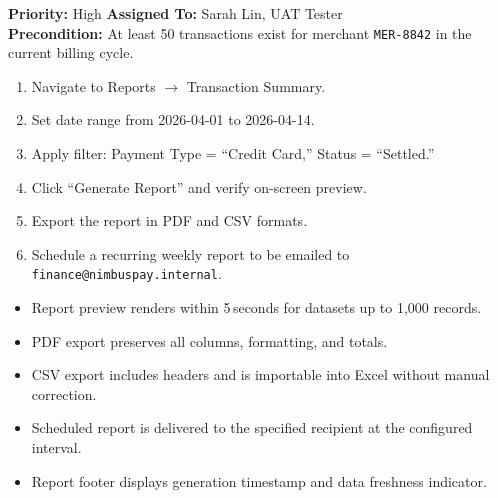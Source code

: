 \begin{tcolorbox}[
  enhanced,
  colback=white,
  colframe=accentBlue,
  boxrule=1pt,
  left=12pt,
  right=12pt,
  top=10pt,
  bottom=10pt,
  sharp corners,
  title={\textbf{TC-003: Transaction Report Generation \& Export}},
  fonttitle=\bfseries\color{white},
  colbacktitle=accentBlue
]
  \textbf{Priority:} High \hfill \textbf{Assigned To:} Sarah Lin, UAT Tester\\[4pt]
  \textbf{Precondition:} At least 50 transactions exist for merchant \texttt{MER-8842} in the current billing cycle.\\[4pt]

  \begin{tcolorbox}[
    enhanced,
    colback=bgLight,
    colframe=borderGray,
    boxrule=0.5pt,
    left=10pt,
    right=10pt,
    top=6pt,
    bottom=6pt,
    sharp corners,
    title={Test Steps},
    fonttitle=\bfseries\color{primaryNavy}
  ]
    \begin{enumerate}[nosep, leftmargin=*]
      \item Navigate to Reports $\rightarrow$ Transaction Summary.
      \item Set date range from 2026-04-01 to 2026-04-14.
      \item Apply filter: Payment Type = ``Credit Card,'' Status = ``Settled.''
      \item Click ``Generate Report'' and verify on-screen preview.
      \item Export the report in PDF and CSV formats.
      \item Schedule a recurring weekly report to be emailed to \texttt{finance@nimbuspay.internal}.
    \end{enumerate}
  \end{tcolorbox}

  \vspace{4pt}

  \begin{tcolorbox}[
    enhanced,
    colback=bgLight,
    colframe=statusPass,
    boxrule=0.5pt,
    left=10pt,
    right=10pt,
    top=6pt,
    bottom=6pt,
    sharp corners,
    title={\passmark\ Acceptance Criteria},
    fonttitle=\bfseries\color{statusPass}
  ]
    \begin{itemize}[nosep, leftmargin=*]
      \item Report preview renders within 5\,seconds for datasets up to 1,000 records.
      \item PDF export preserves all columns, formatting, and totals.
      \item CSV export includes headers and is importable into Excel without manual correction.
      \item Scheduled report is delivered to the specified recipient at the configured interval.
      \item Report footer displays generation timestamp and data freshness indicator.
    \end{itemize}
  \end{tcolorbox}
\end{tcolorbox}

